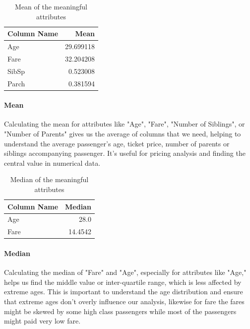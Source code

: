 \documentclass[a4paper, 12pt]{article}
\begin{document}
\begin{table}[h]
  \centering
  \begin{tabular}{lr}
    \hline
    \textbf{Column Name} & \textbf{Mean} \\
    \hline
    Age & 29.699118 \\
    Fare & 32.204208 \\
    SibSp & 0.523008 \\
    Parch & 0.381594 \\
    \hline
  \end{tabular}
  \caption{Mean of the meaningful attributes} 
  \paragraph*{Mean}
  \justifying
Calculating the mean for attributes like "Age", "Fare", "Number of Siblings", or "Number of Parents" gives us the average of columns that we need, helping to understand the average passenger's age, ticket price, number of parents or siblings accompanying passenger. It's useful for pricing analysis and finding the central value in numerical data.
\end{table} 

\begin{table}[h]
  \centering
  \begin{tabular}{lr}
    \hline
    \textbf{Column Name} & \textbf{Median} \\
    \hline
    Age & 28.0 \\
    Fare & 14.4542 \\
    \hline
  \end{tabular}
  \caption{Median of the meaningful attributes} 
  \paragraph*{Median}
  \justifying
Calculating the median of "Fare" and "Age", especially for attributes like "Age," helps us find the middle value or inter-quartile range, which is less affected by extreme ages. This is important to understand the age distribution and ensure that extreme ages don't overly influence our analysis, likewise for fare the fares might be skewed by some high class passengers while most of the passengers might paid very low fare.
\end{table} 
\end{document}
